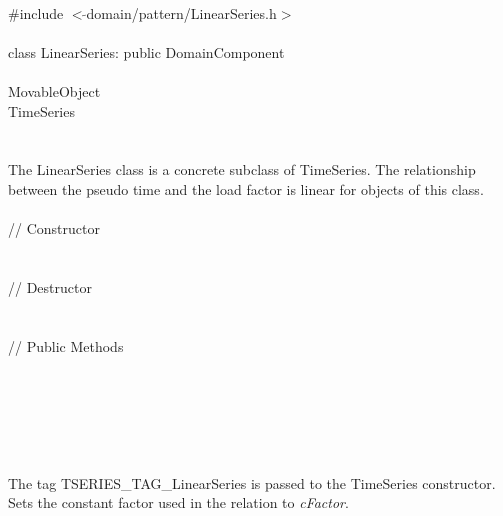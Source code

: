 
   \\
\indent \#include $<\tilde{ }$domain/pattern/LinearSeries.h$>$  \\

  \\
\indent class LinearSeries: public DomainComponent  \\

 \\
\indent MovableObject \\
\indent\indent TimeSeries \\
\indent\indent{} \\

 \\ 
\indent The LinearSeries class is a concrete subclass of TimeSeries.
The relationship between the pseudo time and the load factor is linear
for objects of this class. \\


 \\
\indent // Constructor \\ 
\\ \\
\indent // Destructor \\ 
\\  \\
\indent // Public Methods \\ 
\\
\\
\\
\\

 \\ 
\\ 
The tag TSERIES\_TAG\_LinearSeries is passed to the TimeSeries
constructor. Sets the constant factor used in the relation to {\em
cFactor}. \\

